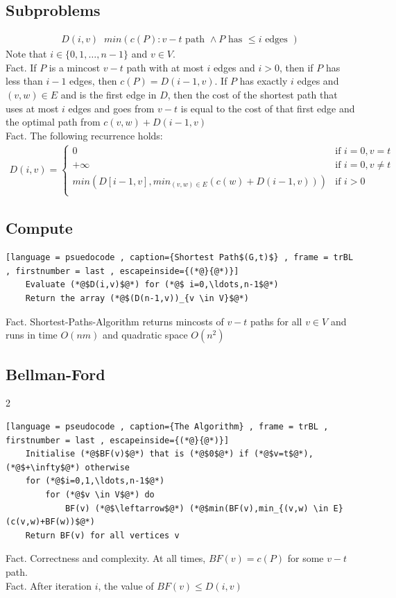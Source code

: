 \documentclass[a4paper]{article}
\theoremstyle{plain}
\newcommand*{\MyDef}{\mathrm{def}}
\newcommand*{\eqdef}{\ensuremath{\mathop{\overset{\MyDef}{=}}}}
\theoremstyle{definition}
\theoremstyle{remark}
\begin{document}
	\subsection{Subproblems}
	\begin{align*}
		D(i,v) \eqdef min\left( c(P) : v-t \text{ path } \land P \text{ has } \le i \text{ edges } \right) 
	\end{align*}	
	Note that $i \in \{0,1,\ldots,n-1\}$ and $v \in V$. \\
	Fact. If $P$ is a mincost $v-t$ path with at most $i$ edges and $i>0$, then if $P$ has less than $i-1$ edges, then $c(P) = D(i-1,v)$. If $P$ has exactly $i$ edges and $(v,w) \in E$ and is the first edge in $D$, then the cost of the shortest path that uses at most $i$ edges and goes from $v-t$ is equal to the cost of that first edge and the optimal path from $c(v,w)+D(i-1,v)$ \\
	Fact. The following recurrence holds:
	\begin{align*}
		D(i,v) = \begin{cases}
		0	& \text{if }i=0, v=t \\
		+\infty	&\text{if }i=0, v\neq t\\
		min(D[i-1,v], min_{(v,w) \in E}(c(w) + D(i-1,v)))	&\text{if }i>0 \\
		\end{cases}
	\end{align*}
	\subsection{Compute}
	\begin{lstlisting}[language = psuedocode , caption={Shortest Path$(G,t)$} , frame = trBL , firstnumber = last , escapeinside={(*@}{@*)}]
	Evaluate (*@$D(i,v)$@*) for (*@$ i=0,\ldots,n-1$@*)
	Return the array (*@$(D(n-1,v))_{v \in V}$@*)
	\end{lstlisting}
	Fact. Shortest-Paths-Algorithm returns mincosts of $v-t$ paths for all $v \in V$ and runs in time $O(nm)$ and quadratic space  $O(n^2)$
	\subsection{Bellman-Ford}2
	\begin{lstlisting}[language = pseudocode , caption={The Algorithm} , frame = trBL , firstnumber = last , escapeinside={(*@}{@*)}]
	Initialise (*@$BF(v)$@*) that is (*@$0$@*) if (*@$v=t$@*), (*@$+\infty$@*) otherwise
	for (*@$i=0,1,\ldots,n-1$@*)
		for (*@$v \in V$@*) do
			BF(v) (*@$\leftarrow$@*) (*@$min(BF(v),min_{(v,w) \in E}(c(v,w)+BF(w))$@*)
	Return BF(v) for all vertices v
	\end{lstlisting}
	Fact. Correctness and complexity. At all times, $BF(v)= c(P)$ for some $v-t$ path.\\
	Fact. After iteration $i$, the value of $BF(v) \le D(i,v)$
\end{document}
